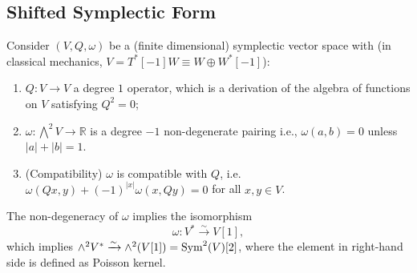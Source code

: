 \documentclass[10pt]{article}
\begin{document}
\subsection{Shifted Symplectic Form}

Consider $(V, Q, \omega)$ be a (finite dimensional) symplectic vector space with (in classical mechanics, $ V = T^{*}[-1]W \equiv W \oplus W^{*}[-1]$):
\begin{enumerate}[(1)]
  \item $ Q: V \rightarrow V$ a degree $ 1$ operator, which is a derivation of the algebra of functions on $ V$ satisfying $ Q^{2} = 0$;
  \item $ \omega : \bigwedge \nolimits^{2} V \rightarrow \mathbb{R}$ is a degree $ -1$ non-degenerate pairing i.e., $\omega(a,b) = 0$ unless $\left| a \right| + \left| b \right| = 1$.
  \item (Compatibility) $ \omega$ is compatible with $ Q$, i.e. $ \omega(Qx, y) + (-1)^{\left| x \right|} \omega(x, Qy) = 0$ for all $ x, y \in V$.
\end{enumerate}
The non-degeneracy of $ \omega$ implies the isomorphism
\begin{equation*}
  \omega: V^{*} \xrightarrow{\sim } V[1],
\end{equation*}
which implies $\wedge^{2} V^{*} \xrightarrow{\sim } \wedge^{2}(V[1]) = \operatorname{Sym}^{2}(V)[2]$, where the element in right-hand side is defined as Poisson kernel.
\end{document}

